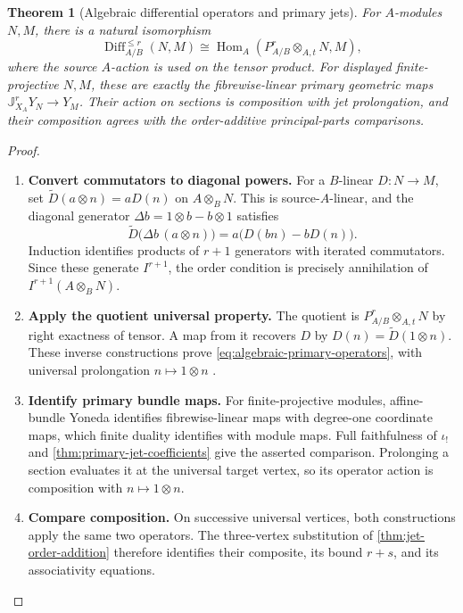 \documentclass[11pt,a4paper]{article}
\numberwithin{algorithm}{section}
\numberwithin{equation}{section}
\newtheorem{theorem}{Theorem}[section]
\theoremstyle{definition}
\theoremstyle{remark}
\theoremstyle{plain}
\newcommand{\Hom}{\operatorname{Hom}}
\theoremstyle{definition}
\theoremstyle{plain}
\begin{document}
\begin{theorem}[Algebraic differential operators and primary jets]
\label{thm:algebraic-primary-operators}
For $A$-modules $N,M$, there is a natural isomorphism
\begin{equation}\label{eq:algebraic-primary-operators}
 \operatorname{Diff}_{A/B}^{\le r}(N,M)
 \cong\Hom_A(P^r_{A/B}\otimes_{A,t}N,M),
\end{equation}
where the source $A$-action is used on the tensor product.
For displayed finite-projective $N,M$, these are exactly the
fibrewise-linear primary geometric maps
$\mathbb J^r_{X_A}Y_N\to Y_M$.  Their action on sections is
composition with jet prolongation, and their composition agrees
with the order-additive principal-parts comparisons.
\end{theorem}
\begin{proof}\leavevmode
\begin{enumerate}[leftmargin=*,align=left]
\item \textbf{Convert commutators to diagonal powers.}
For a $B$-linear $D:N\to M$, set
$\widetilde D(a\otimes n)=aD(n)$ on $A\otimes_BN$.
This is source-$A$-linear, and the diagonal generator
$\Delta b=1\otimes b-b\otimes1$ satisfies
\[
 \widetilde D\bigl(\Delta b\,(a\otimes n)\bigr)
       =a\bigl(D(bn)-bD(n)\bigr).
\]
Induction identifies products of $r+1$ generators with iterated
commutators. Since these generate $I^{r+1}$, the order condition
is precisely annihilation of $I^{r+1}(A\otimes_BN)$.

\item \textbf{Apply the quotient universal property.}
The quotient is $P^r_{A/B}\otimes_{A,t}N$ by right exactness of
tensor. A map from it recovers $D$ by $D(n)=\widetilde D(1\otimes n)$.
These inverse constructions prove \eqref{eq:algebraic-primary-operators},
with universal prolongation $n\mapsto1\otimes n$
\citep[Tag~09CH]{Stacks}.

\item \textbf{Identify primary bundle maps.}
For finite-projective modules, affine-bundle Yoneda identifies
fibrewise-linear maps with degree-one coordinate maps, which
finite duality identifies with module maps.
Full faithfulness of $\iota_!$ and
\cref{thm:primary-jet-coefficients} give the asserted comparison.
Prolonging a section evaluates it at the universal target vertex,
so its operator action is composition with $n\mapsto1\otimes n$.

\item \textbf{Compare composition.}
On successive universal vertices, both constructions apply the
same two operators. The three-vertex substitution of
\cref{thm:jet-order-addition} therefore identifies their composite,
its bound $r+s$, and its associativity equations.
\end{enumerate}
\end{proof}
\end{document}
